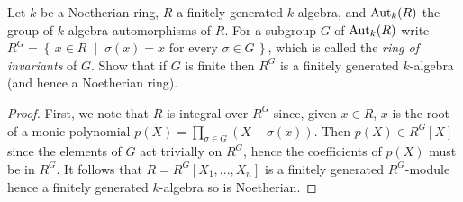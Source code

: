 \newpage
\begin{problem}
Let $k$ be a Noetherian ring, $R$ a finitely generated
$k$-algebra, and $\operatorname{Aut}_k(R)$ the group of $k$-algebra
automorphisms of $R$. For a subgroup $G$ of $\operatorname{Aut}_k(R)$ write
$R^G=\left\{\,x\in R\;\middle|\;\text{$\sigma(x)=x$ for every
    $\sigma\in G$}\,\right\}$, which is called the \emph{ring of
  invariants} of $G$. Show that if $G$ is finite then $R^G$ is a
finitely generated $k$-algebra (and hence a Noetherian ring).
\end{problem}
\begin{proof}
First, we note that $R$ is integral over $R^G$ since, given $x\in
R$, $x$ is the root of a monic polynomial $p(X)=\prod_{\sigma\in
  G}(X-\sigma(x))$. Then $p(X)\in R^G[X]$ since the elements of
$G$ act trivially on $R^G$, hence the coefficients of $p(X)$ must
be in $R^G$. It follows that $R=R^G[X_1,...,X_n]$ is a finitely
generated $R^G$-module hence a finitely generated $k$-algebra so
is Noetherian.
\end{proof}

